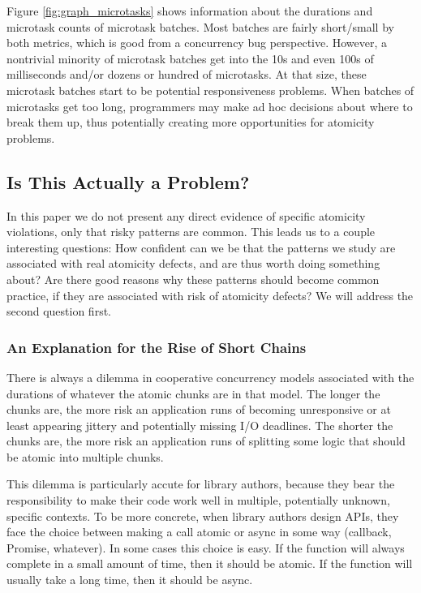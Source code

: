 \documentclass[acmsmall,anonymous,review]{acmart}\settopmatter{printfolios=true,printccs=false,printacmref=false}
\begin{document}
Figure \ref{fig:graph_microtasks} shows information about the durations and microtask counts of microtask batches.
Most batches are fairly short/small by both metrics, which is good from a concurrency bug perspective.
However, a nontrivial minority of microtask batches get into the 10s and even 100s of milliseconds and/or dozens or hundred of microtasks.
At that size, these microtask batches start to be potential responsiveness problems.
When batches of microtasks get too long, programmers may make ad hoc decisions about where to break them up, thus potentially creating more opportunities for atomicity problems.

\subsection{Is This Actually a Problem?}

In this paper we do not present any direct evidence of specific atomicity violations, only that risky patterns are common.
This leads us to a couple interesting questions:
How confident can we be that the patterns we study are associated with real atomicity defects, and are thus worth doing something about?
Are there good reasons why these patterns should become common practice, if they are associated with risk of atomicity defects?
We will address the second question first.

\subsubsection{An Explanation for the Rise of Short Chains}

There is always a dilemma in cooperative concurrency models associated with the durations of whatever the atomic chunks are in that model.
The longer the chunks are, the more risk an application runs of becoming unresponsive or at least appearing jittery and potentially missing I/O deadlines.
The shorter the chunks are, the more risk an application runs of splitting some logic that should be atomic into multiple chunks.

This dilemma is particularly accute for library authors, because they bear the responsibility to make their code work well in multiple, potentially unknown, specific contexts.
To be more concrete, when library authors design APIs, they face the choice between making a call atomic or async in some way (callback, Promise, whatever).
In some cases this choice is easy.
If the function will always complete in a small amount of time, then it should be atomic.
If the function will usually take a long time, then it should be async.
\end{document}
